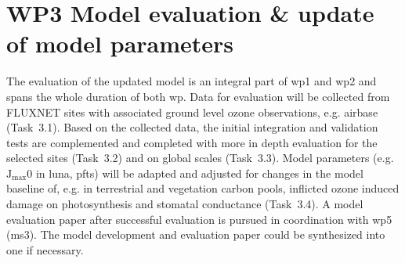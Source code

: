 \section{WP3 Model evaluation \& update of model parameters}
\label{sec:wp3}
The evaluation of the updated model is an integral part of \gls{wp}1 and \gls{wp}2 and spans the whole duration of both \gls{wp}. Data for evaluation will be collected from FLUXNET sites with associated ground level ozone observations, e.g. \gls{airbase} (Task~3.1). Based on the collected data, the initial integration and validation tests are complemented and completed with more in depth evaluation for the selected sites (Task~3.2) and on global scales (Task~3.3). Model parameters  (e.g. $\mathrm{J_{max}}$0 in \gls{luna}, \glspl{pft}) will be adapted and adjusted for changes in the model baseline of, e.g. in terrestrial and vegetation carbon pools, inflicted ozone induced damage on photosynthesis and stomatal conductance (Task~3.4). A model evaluation paper after successful evaluation is pursued in coordination with \gls{wp}5 (\gls{ms}3). The model development and evaluation paper could be synthesized into one if necessary.

